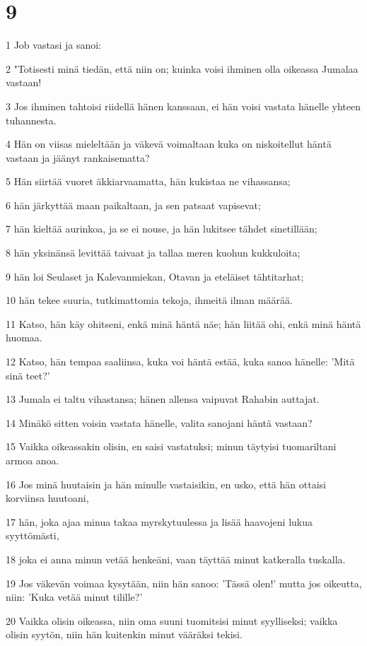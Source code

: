 \chapter{9}

\par 1 Job vastasi ja sanoi:
\par 2 "Totisesti minä tiedän, että niin on; kuinka voisi ihminen olla oikeassa Jumalaa vastaan!
\par 3 Jos ihminen tahtoisi riidellä hänen kanssaan, ei hän voisi vastata hänelle yhteen tuhannesta.
\par 4 Hän on viisas mieleltään ja väkevä voimaltaan kuka on niskoitellut häntä vastaan ja jäänyt rankaisematta?
\par 5 Hän siirtää vuoret äkkiarvaamatta, hän kukistaa ne vihassansa;
\par 6 hän järkyttää maan paikaltaan, ja sen patsaat vapisevat;
\par 7 hän kieltää aurinkoa, ja se ei nouse, ja hän lukitsee tähdet sinetillään;
\par 8 hän yksinänsä levittää taivaat ja tallaa meren kuohun kukkuloita;
\par 9 hän loi Seulaset ja Kalevanmiekan, Otavan ja eteläiset tähtitarhat;
\par 10 hän tekee suuria, tutkimattomia tekoja, ihmeitä ilman määrää.
\par 11 Katso, hän käy ohitseni, enkä minä häntä näe; hän liitää ohi, enkä minä häntä huomaa.
\par 12 Katso, hän tempaa saaliinsa, kuka voi häntä estää, kuka sanoa hänelle: 'Mitä sinä teet?'
\par 13 Jumala ei taltu vihastansa; hänen allensa vaipuvat Rahabin auttajat.
\par 14 Minäkö sitten voisin vastata hänelle, valita sanojani häntä vastaan?
\par 15 Vaikka oikeassakin olisin, en saisi vastatuksi; minun täytyisi tuomariltani armoa anoa.
\par 16 Jos minä huutaisin ja hän minulle vastaisikin, en usko, että hän ottaisi korviinsa huutoani,
\par 17 hän, joka ajaa minua takaa myrskytuulessa ja lisää haavojeni lukua syyttömästi,
\par 18 joka ei anna minun vetää henkeäni, vaan täyttää minut katkeralla tuskalla.
\par 19 Jos väkevän voimaa kysytään, niin hän sanoo: 'Tässä olen!' mutta jos oikeutta, niin: 'Kuka vetää minut tilille?'
\par 20 Vaikka olisin oikeassa, niin oma suuni tuomitsisi minut syylliseksi; vaikka olisin syytön, niin hän kuitenkin minut vääräksi tekisi.

